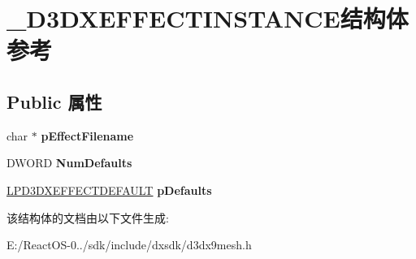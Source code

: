 \hypertarget{struct___d3_d_x_e_f_f_e_c_t_i_n_s_t_a_n_c_e}{}\section{\+\_\+\+D3\+D\+X\+E\+F\+F\+E\+C\+T\+I\+N\+S\+T\+A\+N\+C\+E结构体 参考}
\label{struct___d3_d_x_e_f_f_e_c_t_i_n_s_t_a_n_c_e}
\subsection*{Public 属性}
\begin{DoxyCompactItemize}
\item 
\mbox{\label{struct___d3_d_x_e_f_f_e_c_t_i_n_s_t_a_n_c_e_aff0bfd586126ca3d8d6f789bfa3ca899}} 
char $\ast$ {\bfseries p\+Effect\+Filename}
\item 
\mbox{\label{struct___d3_d_x_e_f_f_e_c_t_i_n_s_t_a_n_c_e_a9b9b626927fd9ac8ef7192c198d6fc55}} 
D\+W\+O\+RD {\bfseries Num\+Defaults}
\item 
\mbox{\label{struct___d3_d_x_e_f_f_e_c_t_i_n_s_t_a_n_c_e_aa7cedfd9c02741ebaef245fb9cda1ff2}} 
\hyperlink{struct___d3_d_x_e_f_f_e_c_t_d_e_f_a_u_l_t}{L\+P\+D3\+D\+X\+E\+F\+F\+E\+C\+T\+D\+E\+F\+A\+U\+LT} {\bfseries p\+Defaults}
\end{DoxyCompactItemize}


该结构体的文档由以下文件生成\+:\begin{DoxyCompactItemize}
\item 
E\+:/\+React\+O\+S-\/0../sdk/include/dxsdk/d3dx9mesh.\+h\end{DoxyCompactItemize}
